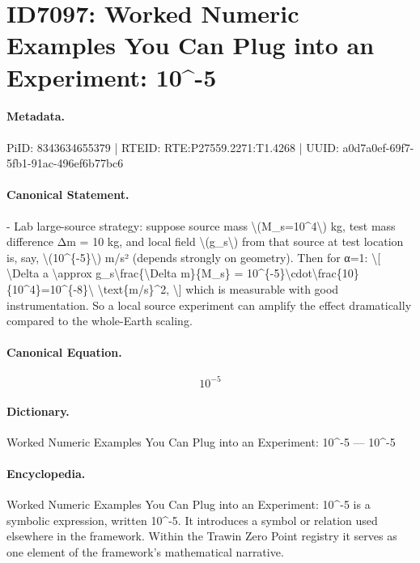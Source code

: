 \section*{ID7097: Worked Numeric Examples You Can Plug into an Experiment: 10\textasciicircum{}-5}
\paragraph{Metadata.}
PiID: 8343634655379 | RTEID: RTE:P27559.2271:T1.4268 | UUID: a0d7a0ef-69f7-5fb1-91ac-496ef6b77bc6

\paragraph{Canonical Statement.}
- Lab large-source strategy: suppose source mass \textbackslash{}(M\_s=10\textasciicircum{}4\textbackslash{}) kg, test mass difference Δm = 10 kg, and local field \textbackslash{}(g\_s\textbackslash{}) from that source at test location is, say, \textbackslash{}(10\textasciicircum{}\{-5\}\textbackslash{}) m/s² (depends strongly on geometry). Then for α=1: \textbackslash{}[ \textbackslash{}Delta a \textbackslash{}approx g\_s\textbackslash{}frac\{\textbackslash{}Delta m\}\{M\_s\} = 10\textasciicircum{}\{-5\}\textbackslash{}cdot\textbackslash{}frac\{10\}\{10\textasciicircum{}4\}=10\textasciicircum{}\{-8\}\textbackslash{} \textbackslash{}text\{m/s\}\textasciicircum{}2, \textbackslash{}] which is measurable with good instrumentation. So a local source experiment can amplify the effect dramatically compared to the whole-Earth scaling.

\paragraph{Canonical Equation.}
\[
10^{-5}
\]

\paragraph{Dictionary.}
Worked Numeric Examples You Can Plug into an Experiment: 10\textasciicircum{}-5 — 10\textasciicircum{}-5

\paragraph{Encyclopedia.}
Worked Numeric Examples You Can Plug into an Experiment: 10\textasciicircum{}-5 is a symbolic expression, written 10\textasciicircum{}-5. It introduces a symbol or relation used elsewhere in the framework. Within the Trawin Zero Point registry it serves as one element of the framework's mathematical narrative.
